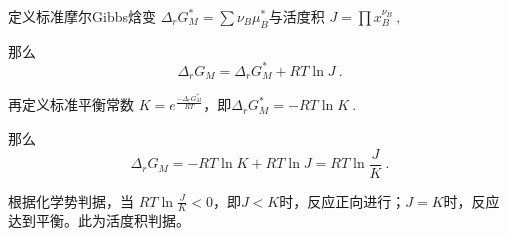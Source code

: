 定义标准摩尔Gibbs焓变 $\Delta _r G_M^*=\sum \nu_B \mu_B^*$与活度积 $J=\prod x_B^{\nu_B}~,$

那么
\begin{equation}
\Delta _r G_M = \Delta _r G_M^* + RT \ln J~.
\end{equation}

再定义标准平衡常数 $K = e^{\frac{-\Delta _r G_M^*}{RT}}$，即$\Delta _r G_M^* = -RT \ln K~.$

那么 
\begin{equation}
\Delta _r G_M = -RT \ln K + RT \ln J = RT \ln \frac{J}{K}~.
\end{equation}

根据化学势判据，当 
$RT \ln \frac{J}{K} < 0$，即$J<K$时，反应正向进行；$J=K$时，反应达到平衡。此为活度积判据。
